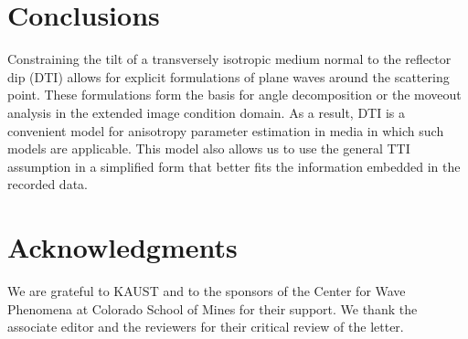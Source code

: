 \section{Conclusions}

Constraining the tilt of a transversely isotropic medium normal to the reflector dip (DTI) allows for explicit formulations of plane waves around the scattering point. These formulations form the basis for angle decomposition or the moveout analysis in the extended image condition domain. As a result, DTI is a convenient model for anisotropy parameter estimation in media in which such models are applicable. This model also allows us to use the general TTI assumption in a simplified form that better fits the information embedded in the recorded data.


\section{Acknowledgments}
We are grateful to KAUST and to the sponsors of the Center for Wave Phenomena at Colorado School of Mines for their support. We thank the associate editor and the reviewers for their critical review of the letter.

